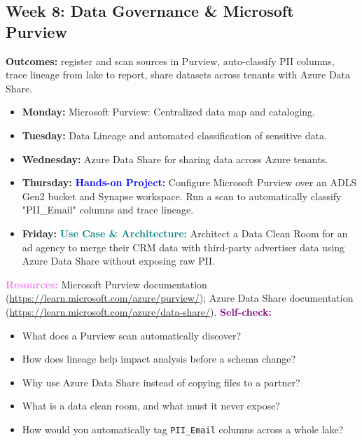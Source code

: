 \documentclass[11pt, a4paper]{article}
\newcommand{\project}[1]{\vspace{1mm}\noindent\textbf{\textcolor{blue}{Hands-on Project:}} #1}
\newcommand{\usecase}[1]{\vspace{1mm}\noindent\textbf{\textcolor{teal}{Use Case \& Architecture:}} #1}
\newcommand{\dayitem}[2]{\item \textbf{#1:} #2}
\newcommand{\resources}[1]{\vspace{1mm}\noindent\textbf{\textcolor{violet}{Resources:}} #1}
\newcommand{\selfcheck}[1]{\vspace{1mm}\noindent\textbf{\textcolor{purple}{Self-check:}} #1}
\begin{document}
\subsection*{Week 8: Data Governance \& Microsoft Purview}
\par\noindent\textbf{Outcomes:} register and scan sources in Purview, auto-classify PII columns, trace lineage from lake to report, share datasets across tenants with Azure Data Share.
\begin{itemize}[label=-]
    \dayitem{Monday}{Microsoft Purview: Centralized data map and cataloging.}
    \dayitem{Tuesday}{Data Lineage and automated classification of sensitive data.}
    \dayitem{Wednesday}{Azure Data Share for sharing data across Azure tenants.}
    \dayitem{Thursday}{\project{Configure Microsoft Purview over an ADLS Gen2 bucket and Synapse workspace. Run a scan to automatically classify "PII\_Email" columns and trace lineage.}}
    \dayitem{Friday}{\usecase{Architect a Data Clean Room for an ad agency to merge their CRM data with third-party advertiser data using Azure Data Share without exposing raw PII.}}
\end{itemize}
\resources{Microsoft Purview documentation (\url{https://learn.microsoft.com/azure/purview/}); Azure Data Share documentation (\url{https://learn.microsoft.com/azure/data-share/}).}
\selfcheck{\begin{itemize}[label=-, itemsep=0pt]
    \item What does a Purview scan automatically discover?
    \item How does lineage help impact analysis before a schema change?
    \item Why use Azure Data Share instead of copying files to a partner?
    \item What is a data clean room, and what must it never expose?
    \item How would you automatically tag \texttt{PII\_Email} columns across a whole lake?
\end{itemize}}
\end{document}

